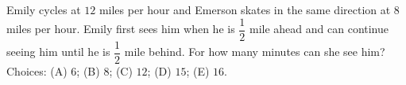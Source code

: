 Emily cycles at $12$ miles per hour and Emerson skates in the same direction at $8$ miles per hour. Emily first sees him when he is $\dfrac{1}{2}$ mile ahead and can continue seeing him until he is $\dfrac{1}{2}$ mile behind. For how many minutes can she see him? Choices: (A) $6$; (B) $8$; (C) $12$; (D) $15$; (E) $16$.
